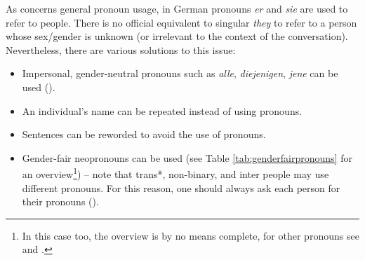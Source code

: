 \begin{table}
    \caption[Overview of the \textit{De-E-System}]{Overview of the \textit{De-E-System} (\cite{vereindeutschdee})}
    \label{tab:de-e-system}
\end{table}

As concerns general pronoun usage, in German pronouns \textit{er} and \textit{sie} are used to refer to people. There is no official equivalent to singular \textit{they} to refer to a person whose sex/gender is unknown (or irrelevant to the context of the conversation). Nevertheless, there are various solutions to this issue: 
\begin{itemize}
\setlength\itemsep{-0.5em}
    \item Impersonal, gender-neutral pronouns such as \textit{alle}, \textit{diejenigen}, \textit{jene} can be used (\cite[7]{unileipzig2020}).
    \item An individual's name can be repeated instead of using pronouns.
    \item Sentences can be reworded to avoid the use of pronouns.
    \item Gender-fair neopronouns can be used (see Table \ref{tab:genderfairpronouns} for an overview\footnote{In this case too, the overview is by no means complete, for other pronouns see \textcite{nibipronomen} and \textcite{pronomen}.}) -- note that trans*, non-binary, and inter people may use different pronouns. For this reason, one should always ask each person for their pronouns (\cite[38]{boka2021richtlinie}).
\end{itemize}

